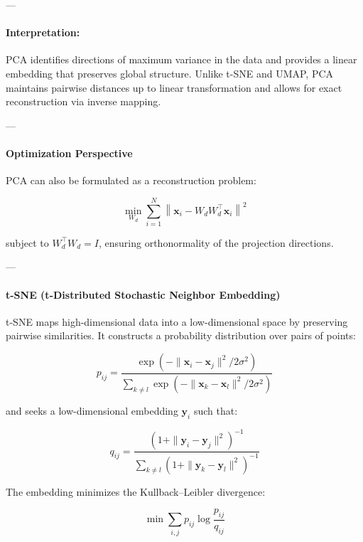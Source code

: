 \documentclass[12pt,a4paper]{report}
\begin{document}
---

\paragraph{Interpretation:}
PCA identifies directions of maximum variance in the data and provides a linear embedding that preserves global structure. Unlike t-SNE and UMAP, PCA maintains pairwise distances up to linear transformation and allows for exact reconstruction via inverse mapping.

---

\paragraph{Optimization Perspective}

PCA can also be formulated as a reconstruction problem:

\begin{equation}
    \min_{W_d} \sum_{i=1}^{N} \left\| \mathbf{x}_i - W_d W_d^\top \mathbf{x}_i \right\|^2
\end{equation}

subject to $W_d^\top W_d = I$, ensuring orthonormality of the projection directions.

---

\paragraph{t-SNE (t-Distributed Stochastic Neighbor Embedding)}

t-SNE maps high-dimensional data into a low-dimensional space by preserving pairwise similarities. It constructs a probability distribution over pairs of points:

\begin{equation}
    p_{ij} = \frac{\exp(-\|\mathbf{x}_i - \mathbf{x}_j\|^2 / 2\sigma^2)}{\sum_{k \neq l} \exp(-\|\mathbf{x}_k - \mathbf{x}_l\|^2 / 2\sigma^2)}
\end{equation}

and seeks a low-dimensional embedding $\mathbf{y}_i$ such that:

\begin{equation}
    q_{ij} = \frac{(1 + \|\mathbf{y}_i - \mathbf{y}_j\|^2)^{-1}}{\sum_{k \neq l} (1 + \|\mathbf{y}_k - \mathbf{y}_l\|^2)^{-1}}
\end{equation}

The embedding minimizes the Kullback–Leibler divergence:

\begin{equation}
    \min \sum_{i,j} p_{ij} \log \frac{p_{ij}}{q_{ij}}
\end{equation}
\end{document}
